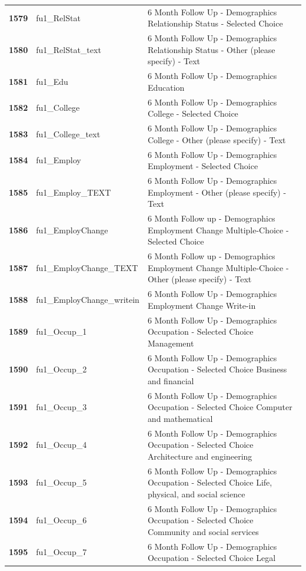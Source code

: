 \documentclass[
  letterpaper,
  DIV=11,
  numbers=noendperiod]{scrartcl}
\begin{document}
\begin{longtable}[t]{>{}cll}
\textbf{1579} & fu1\_RelStat & 6 Month Follow Up - Demographics Relationship Status - Selected Choice\\
\textbf{1580} & fu1\_RelStat\_text & 6 Month Follow Up - Demographics Relationship Status - Other (please specify) - Text\\
\addlinespace
\textbf{1581} & fu1\_Edu & 6 Month Follow Up - Demographics Education\\
\textbf{1582} & fu1\_College & 6 Month Follow Up - Demographics College - Selected Choice\\
\textbf{1583} & fu1\_College\_text & 6 Month Follow Up - Demographics College - Other (please specify) - Text\\
\textbf{1584} & fu1\_Employ & 6 Month Follow Up - Demographics Employment - Selected Choice\\
\textbf{1585} & fu1\_Employ\_TEXT & 6 Month Follow Up - Demographics Employment - Other (please specify) - Text\\
\addlinespace
\textbf{1586} & fu1\_EmployChange & 6 Month Follow up - Demographics Employment Change Multiple-Choice - Selected Choice\\
\textbf{1587} & fu1\_EmployChange\_TEXT & 6 Month Follow up - Demographics Employment Change Multiple-Choice - Other (please specify) - Text\\
\textbf{1588} & fu1\_EmployChange\_writein & 6 Month Follow Up - Demographics Employment Change Write-in\\
\textbf{1589} & fu1\_Occup\_1 & 6 Month Follow Up - Demographics Occupation - Selected Choice Management\\
\textbf{1590} & fu1\_Occup\_2 & 6 Month Follow Up - Demographics Occupation - Selected Choice Business and financial\\
\addlinespace
\textbf{1591} & fu1\_Occup\_3 & 6 Month Follow Up - Demographics Occupation - Selected Choice Computer and mathematical\\
\textbf{1592} & fu1\_Occup\_4 & 6 Month Follow Up - Demographics Occupation - Selected Choice Architecture and engineering\\
\textbf{1593} & fu1\_Occup\_5 & 6 Month Follow Up - Demographics Occupation - Selected Choice Life, physical, and social science\\
\textbf{1594} & fu1\_Occup\_6 & 6 Month Follow Up - Demographics Occupation - Selected Choice Community and social services\\
\textbf{1595} & fu1\_Occup\_7 & 6 Month Follow Up - Demographics Occupation - Selected Choice Legal\\

\end{longtable}
\end{document}

